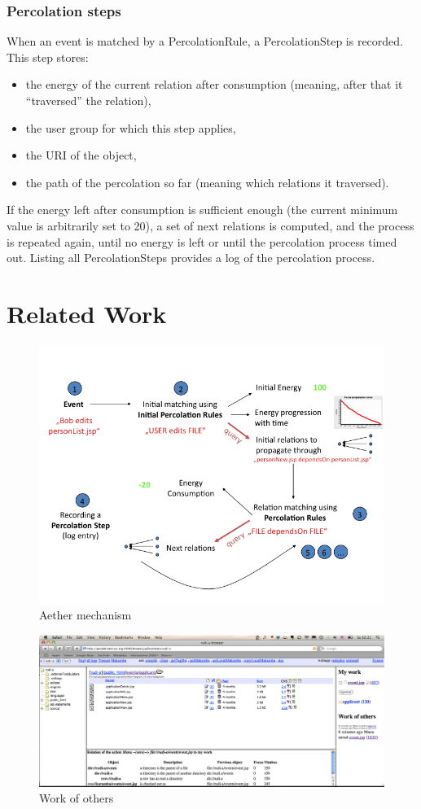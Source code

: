\documentclass{ecscw2007}
\begin{document}
\subsubsection*{Percolation steps}
When an event is matched by a PercolationRule, a PercolationStep is recorded. This step stores:
\begin{itemize}
	\item the energy of the current relation after consumption (meaning, after that it ``traversed'' the relation),
    \item the user group for which this step applies,
    \item the URI of the object,
    \item the path of the percolation so far (meaning which relations it traversed).
\end{itemize}
    
If the energy left after consumption is sufficient enough (the current minimum value is arbitrarily set to 20), a set of next relations is computed, and the process is repeated again, until no energy is left or until the percolation process timed out.
Listing all PercolationSteps provides a log of the percolation process.

\section*{Related Work} 


\begin{figure}[thb]
  \centering
  \includegraphics[width=.7\linewidth]{aether-mechanism}
  \caption{Aether mechanism}
  \label{fig:aether-mechanism}
\end{figure}

\begin{figure}[thb]
  \centering
  \includegraphics[width=.98\linewidth]{work-others-cropped}
  \caption{Work of others}
  \label{fig:work-others-cropped}
\end{figure}
\end{document}
